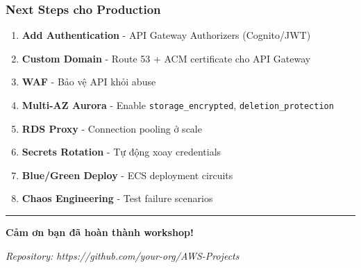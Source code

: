 \hypertarget{next-steps-cho-production}{%
\subsubsection{Next Steps cho
Production}}

\begin{enumerate}
\def\labelenumi{\arabic{enumi}.}
\tightlist
\item
  \textbf{Add Authentication} - API Gateway Authorizers (Cognito/JWT)
\item
  \textbf{Custom Domain} - Route 53 + ACM certificate cho API Gateway
\item
  \textbf{WAF} - Bảo vệ API khỏi abuse
\item
  \textbf{Multi-AZ Aurora} - Enable \texttt{storage\_encrypted},
  \texttt{deletion\_protection}
\item
  \textbf{RDS Proxy} - Connection pooling ở scale
\item
  \textbf{Secrets Rotation} - Tự động xoay credentials
\item
  \textbf{Blue/Green Deploy} - ECS deployment circuits
\item
  \textbf{Chaos Engineering} - Test failure scenarios
\end{enumerate}

\begin{center}\rule{0.5\linewidth}{0.5pt}\end{center}

\textbf{Cảm ơn bạn đã hoàn thành workshop!}

\emph{Repository: https://github.com/your-org/AWS-Projects}

